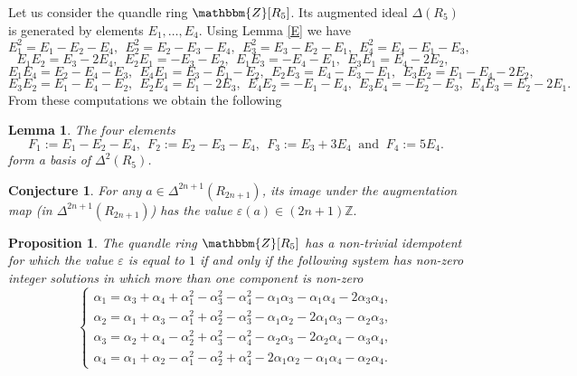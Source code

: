 \documentclass[12pt]{amsart}
\newtheorem{pro}[thm]{Proposition}
\newtheorem{lemma}[thm]{Lemma}
\newtheorem{conj}[thm]{Conjecture}
\theoremstyle{definition}
\theoremstyle{remark}
\begin{document}
Let us consider the quandle ring  $\mathbbm {Z}[R_5]$.
Its augmented ideal $\Delta(R_5)$ is generated by elements 
 $E_1, \ldots, E_4$. Using Lemma \ref{E} we have
$$
E_1^2 = E_1 - E_2 - E_4,~~E_2^2 = E_2 - E_3 - E_4,~~E_3^2 = E_3 - E_2 - E_1,~~E_4^2 = E_4 - E_1 - E_3,
$$
$$
E_1 E_2 =  E_3 - 2 E_4,~~E_2 E_1 =  - E_3 - E_2,~~E_1 E_3 =  - E_4 - E_1,~~E_3 E_1 = E_4 - 2 E_2,~~
$$
$$
E_1 E_4 =  E_2 -  E_4 - E_3,~~E_4 E_1 =  E_3 - E_1 - E_2,~~E_2 E_3 =   E_4 - E_3 - E_1,~~E_3 E_2 = E_1 - E_4 - 2 E_2, 
$$
$$
E_3 E_2 = E_1 - E_4 - E_2,~~E_2 E_4 =  E_1 -  2 E_3,~~E_4 E_2 =   - E_1 - E_4,~~E_3 E_4 =    - E_2 - E_3,~~E_4 E_3 =  E_2 - 2 E_1.
$$
From these computations we obtain the following 
\begin{lemma} \label{sqr}
The four elements
$$
F_1:=E_1 - E_2 - E_4,~~F_2:=E_2 - E_3 - E_4,~~ F_3:=E_3 + 3  E_4\;\;  \mbox{and} \;\; F_4:=5 E_4.
$$
form a basis of $\Delta^2(R_5)$.
\end{lemma}


 \begin{conj}
For any $a \in \Delta^{2n+1}(R_{2n+1})$, its image under the augmentation map (in $\Delta^{2n+1}(R_{2n+1})$) has the value $\varepsilon(a) \in (2n+1) \mathbb{Z}.$ 
\end{conj}







\begin{pro}
The quandle ring  $\mathbbm {Z}[R_5]$ has a non-trivial idempotent for which the value $\varepsilon$ is equal to $1$ if and only if 
the following system has non-zero integer  solutions in which more than one component is non-zero
$$
\begin{cases}
\alpha_1 = \alpha_3 + \alpha_4 +   \alpha_1^2 - \alpha_3^2 - \alpha_4^2 - \alpha_1\alpha_3  - \alpha_1 \alpha_4  - 2 \alpha_3 \alpha_4,    \\ 
\alpha_2 = \alpha_1 + \alpha_3   - \alpha_1^2 + \alpha_2^2 - \alpha_3^2 - \alpha_1\alpha_2  - 2 \alpha_1 \alpha_3  -  \alpha_2 \alpha_3,    \\ 
\alpha_3 = \alpha_2 + \alpha_4   -  \alpha_2^2 + \alpha_3^2 - \alpha_4^2 - \alpha_2\alpha_3  - 2 \alpha_2 \alpha_4  -  \alpha_3 \alpha_4,    \\ 
\alpha_4 = \alpha_1 + \alpha_2 - \alpha_1^2 - \alpha_2^2 + \alpha_4^2 - 2 \alpha_1\alpha_2  -  \alpha_1 \alpha_4  -  \alpha_2 \alpha_4.
\end{cases}
$$
\end{pro}
\end{document}
